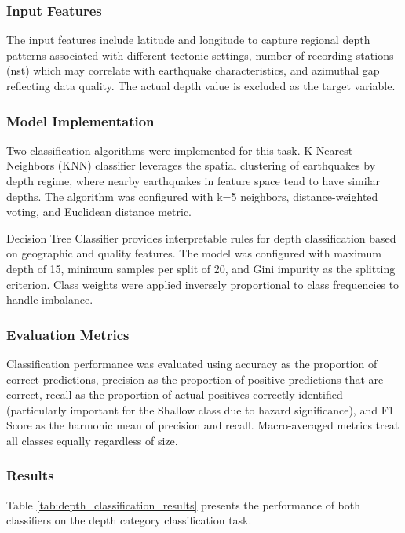 \subsubsection{Input Features}

The input features include latitude and longitude to capture regional depth patterns associated with different tectonic settings, number of recording stations (nst) which may correlate with earthquake characteristics, and azimuthal gap reflecting data quality. The actual depth value is excluded as the target variable.

\subsubsection{Model Implementation}

Two classification algorithms were implemented for this task. K-Nearest Neighbors (KNN) classifier leverages the spatial clustering of earthquakes by depth regime, where nearby earthquakes in feature space tend to have similar depths. The algorithm was configured with k=5 neighbors, distance-weighted voting, and Euclidean distance metric.

Decision Tree Classifier provides interpretable rules for depth classification based on geographic and quality features. The model was configured with maximum depth of 15, minimum samples per split of 20, and Gini impurity as the splitting criterion. Class weights were applied inversely proportional to class frequencies to handle imbalance.

\subsubsection{Evaluation Metrics}

Classification performance was evaluated using accuracy as the proportion of correct predictions, precision as the proportion of positive predictions that are correct, recall as the proportion of actual positives correctly identified (particularly important for the Shallow class due to hazard significance), and F1 Score as the harmonic mean of precision and recall. Macro-averaged metrics treat all classes equally regardless of size.

\subsubsection{Results}

Table \ref{tab:depth_classification_results} presents the performance of both classifiers on the depth category classification task.


